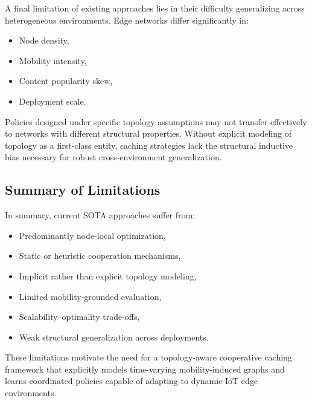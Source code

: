A final limitation of existing approaches lies in their difficulty generalizing across heterogeneous environments. Edge networks differ significantly in:

\begin{itemize}
    \item Node density,
    \item Mobility intensity,
    \item Content popularity skew,
    \item Deployment scale.
\end{itemize}

Policies designed under specific topology assumptions may not transfer effectively to networks with different structural properties. Without explicit modeling of topology as a first-class entity, caching strategies lack the structural inductive bias necessary for robust cross-environment generalization.

\subsection{Summary of Limitations}

In summary, current SOTA approaches suffer from:

\begin{itemize}
    \item Predominantly node-local optimization,
    \item Static or heuristic cooperation mechanisms,
    \item Implicit rather than explicit topology modeling,
    \item Limited mobility-grounded evaluation,
    \item Scalability–optimality trade-offs,
    \item Weak structural generalization across deployments.
\end{itemize}

These limitations motivate the need for a topology-aware cooperative caching framework that explicitly models time-varying mobility-induced graphs and learns coordinated policies capable of adapting to dynamic IoT edge environments.
